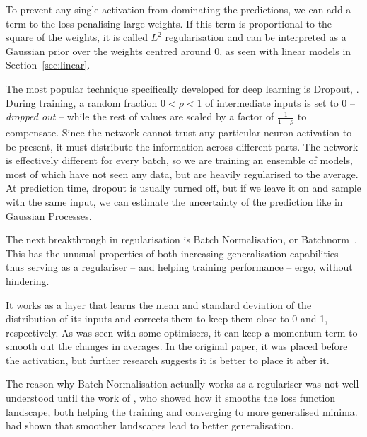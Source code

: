 To prevent any single activation from dominating the predictions, we can add a term to the loss penalising large weights. 
If this term is proportional to the square of the weights, it is called $L^2$ regularisation and can be interpreted as a Gaussian prior over the weights centred around $0$, as seen with linear models in Section~\ref{sec:linear}.

The most popular technique  
specifically developed for deep learning is Dropout, \citep{dropout}.
During training, a random fraction $0 < \rho < 1$ of intermediate inputs is set to $0$ -- \emph{dropped out} --  while the rest of values are scaled by a factor of $\frac{1}{1-\rho}$ to compensate.
Since the network cannot trust any particular neuron activation to be present, it must distribute the information across different parts.
The network is effectively different for every batch, so we are training an ensemble of models, most of which have not seen any data, but are heavily regularised to the average.
At prediction time, dropout is usually turned off, but if we leave it on and sample with the same input, we can estimate the uncertainty of the prediction like in Gaussian Processes.

The next breakthrough in regularisation is Batch Normalisation, or Batchnorm~\citep{bn}. 
This has the unusual properties of both increasing generalisation capabilities -- thus serving as a regulariser -- and helping training performance -- ergo, without hindering.

It works as a layer that learns the mean and standard deviation of the distribution of its inputs and corrects them to keep them close to 0 and 1, respectively.
As was seen with some optimisers, it can keep a momentum term to smooth out the changes in averages.
In the original paper, it was placed before the activation, but further research suggests it is better to place it after it.


The reason why Batch Normalisation 
actually works as a regulariser was not well understood until the work of \citet{how_bn_works}, who showed how it smooths the loss function landscape, both helping the training and converging to more generalised minima.
\citet{large_batch} had shown that smoother landscapes lead to better generalisation.

\begin{center}
	{\adfleafleft}
\end{center}

